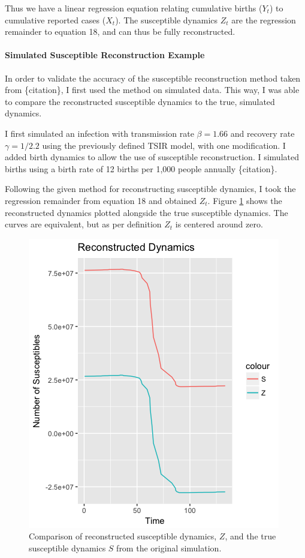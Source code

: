 \documentclass{article}
\begin{document}
Thus we have a linear regression equation relating cumulative births ($Y_{t}$) to cumulative reported cases ($X_{t}$). The susceptible dynamics $Z_{t}$ are the regression remainder to equation 18, and can thus be fully reconstructed. 

\paragraph{Simulated Susceptible Reconstruction Example}
In order to validate the accuracy of the susceptible reconstruction method taken from \{citation\}, I first used the method on simulated data. This way, I was able to compare the reconstructed susceptible dynamics to the true, simulated dynamics. 

I first simulated an infection with transmission rate $\beta = 1.66$ and recovery rate $\gamma = 1/2.2$ using the previously defined TSIR model, with one modification. I added birth dynamics to allow the use of susceptible reconstruction. I simulated births using a birth rate of 12 births per 1,000 people annually \{citation\}. 

Following the given method for reconstructing susceptible dynamics, I took the regression remainder from equation 18 and obtained $Z_{t}$. Figure \ref{fig:ZvsS} shows the reconstructed dynamics plotted alongside the true susceptible dynamics. The curves are equivalent, but as per definition $Z_{t}$ is centered around zero. 

\begin{figure}[htbp]
\includegraphics[scale=.5, center]{ZvsSplot.png}
\caption{Comparison of reconstructed susceptible dynamics, $Z$, and the true susceptible dynamics $S$ from the original simulation.}
\label{fig:ZvsS}
\end{figure}
\end{document}
